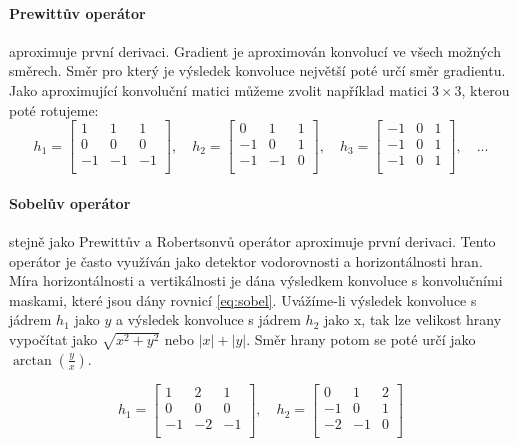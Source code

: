 \paragraph{Prewittův operátor} aproximuje první derivaci. Gradient je aproximován konvolucí ve všech možných směrech. Směr pro který je výsledek konvoluce největší poté určí směr gradientu. Jako aproximující konvoluční matici můžeme zvolit například matici $3\times 3$, kterou poté rotujeme:
\begin{equation}
h_{1}=
\begin{bmatrix}
 1 &  1 &  1\\
 0 &  0 &  0\\ 
-1 & -1 & -1\\ 
\end{bmatrix},  \quad
h_{2}=
\begin{bmatrix}
 0 &  1 &  1\\
-1 &  0 &  1\\ 
-1 & -1 &  0\\ 
\end{bmatrix},  \quad
h_{3}=
\begin{bmatrix}
-1 &  0 &  1\\
-1 &  0 &  1\\ 
-1 &  0 &  1\\ 
\end{bmatrix},\quad ...
\end{equation}

\paragraph{Sobelův operátor} stejně jako Prewittův a Robertsonvů operátor aproximuje první derivaci. Tento operátor je často využíván jako detektor vodorovnosti a horizontálnosti hran. Míra horizontálnosti a vertikálnosti je dána výsledkem konvoluce s konvolučními maskami, které jsou dány rovnicí \ref{eq:sobel}. Uvážíme-li výsledek konvoluce s jádrem $h_{1}$ jako $y$ a výsledek konvoluce s jádrem $h_{2}$ jako x, tak lze velikost hrany vypočítat jako $\sqrt{x^2+y^2}$ nebo $\left| x\right| + \left| y\right|$. Směr hrany potom se poté určí jako $\arctan \left( \frac{y}{x} \right)$. \cite[str.~137]{Image-Processing-Analysis-and-Machine-Vision}

\begin{equation}
\label{eq:sobel}
h_{1}=
\begin{bmatrix}
 1 &  2 &  1\\
 0 &  0 &  0\\ 
-1 & -2 & -1\\ 
\end{bmatrix},  \quad
h_{2}=
\begin{bmatrix}
 0 &  1 &  2\\
-1 &  0 &  1\\ 
-2 & -1 &  0\\ 
\end{bmatrix}
\end{equation}

